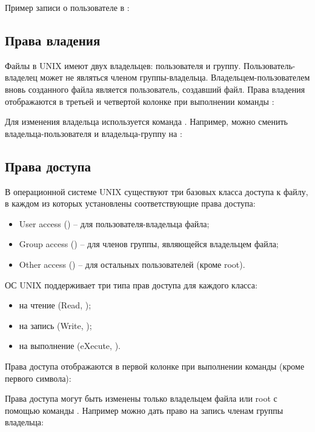 Пример записи о пользователе в :


\subsection{Права владения}

Файлы в UNIX имеют двух владельцев: пользователя и группу. Пользователь-владелец может не являться членом группы-владельца. Владельцем-пользователем вновь созданного файла является пользователь, создавший файл. Права владения отображаются в третьей и четвертой колонке при выполнении команды :


Для изменения владельца используется команда . Например, можно сменить владельца-пользователя и владельца-группу на :


\subsection{Права доступа}

В операционной системе UNIX существуют три базовых класса доступа к файлу, в каждом из которых установлены соответствующие права доступа:
\begin{itemize}
	\item User access () -- для пользователя-владельца файла;
	\item Group access () -- для членов группы, являющейся владельцем файла;
	\item Other access () -- для остальных пользователей (кроме root).
\end{itemize}

ОС UNIX поддерживает три типа прав доступа для каждого класса: 
\begin{itemize}
	\item на чтение (Read, );
	\item на запись (Write, );
	\item на выполнение (eXecute, ).
\end{itemize}

Права доступа отображаются в первой колонке при выполнении команды  (кроме первого символа):


Права доступа могут быть изменены только владельцем файла или root с помощью команды . Например можно дать право на запись членам группы владельца:


